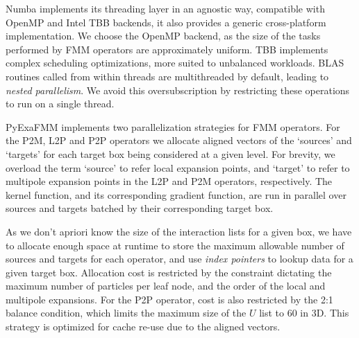 \documentclass{IEEEcsmag}
\begin{document}
Numba implements its threading layer in an agnostic way, compatible with OpenMP and Intel TBB backends, it also provides a generic cross-platform implementation. We choose the OpenMP backend, as the size of the tasks performed by FMM operators are approximately uniform. TBB implements complex scheduling optimizations, more suited to unbalanced workloads. BLAS routines called from within threads are multithreaded by default, leading to \textit{nested parallelism}. We avoid this oversubscription by restricting these operations to run on a single thread.

PyExaFMM implements two parallelization strategies for FMM operators. For the P2M, L2P and P2P operators we allocate aligned vectors of the `sources' and `targets' for each target box being considered at a given level. For brevity, we overload the term `source' to refer local expansion points, and `target' to refer to multipole expansion points in the L2P and P2M operators, respectively. The kernel function, and its corresponding gradient function, are run in parallel over sources and targets batched by their corresponding target box.


As we don't apriori know the size of the interaction lists for a given box, we have to allocate enough space at runtime to store the maximum allowable number of sources and targets for each operator, and use \textit{index pointers} to lookup data for a given target box. Allocation cost is restricted by the constraint dictating the maximum number of particles per leaf node, and the order of the local and multipole expansions. For the P2P operator, cost is also restricted by the 2:1 balance condition, which limits the maximum size of the $U$ list to 60 in 3D. This strategy is optimized for cache re-use due to the aligned vectors.
\end{document}
